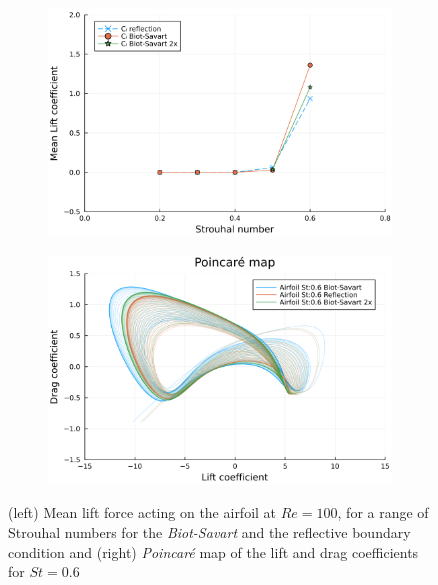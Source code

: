 \documentclass{article}
\begin{document}
\begin{figure}
    \centering
    \begin{subfigure}{.5\textwidth}
        \centering
        \includegraphics[trim={0 0 0 0},clip,width=\textwidth]{tex/fig/CL_mean_deflected_wake.png}
    \end{subfigure}%
    \begin{subfigure}{.5\textwidth}
        \centering
        \includegraphics[trim={0 0 0 0},clip,width=\textwidth]{tex/fig/poincare_deflected_wake.png}
    \end{subfigure}
    \caption{(left) Mean lift force acting on the airfoil at $Re=100$, for a range of Strouhal numbers for the \emph{Biot-Savart} and the reflective boundary condition  and (right) \emph{Poincar\'e} map of the lift and drag coefficients for $St=0.6$}
    \label{fig:deflected_wake_2}
\end{figure}
\end{document}
